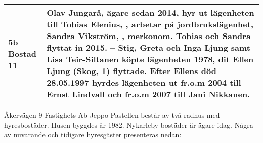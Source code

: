 \begin{center}
\begin{longtable}{l p{}}
    5b Bostad 11 & Olav Jungarå, ägare sedan 2014, hyr ut lägenheten till Tobias Elenius, \textborn 1993, arbetar på jordbrukslägenhet, Sandra Vikström, \textborn 1995, merkonom. Tobias och Sandra flyttat in 2015. -- Stig, Greta och Inga Ljung samt Lisa Teir-Siltanen köpte lägenheten 1978, dit Ellen Ljung (Skog, 1) flyttade. Efter Ellens död 28.05.1997 hyrdes lägenheten ut fr.o.m 2004 till Ernst Lindvall och fr.o.m 2007 till Jani Nikkanen. \\
    \hline
  \end{longtable}
\end{center}






Åkervägen 9 Fastighets Ab Jeppo Pastellen består av två radhus med hyresbostäder. Husen byggdes år 1982. Nykarleby bostäder är ägare idag. Några av nuvarande och tidigare hyresgäster presenteras nedan:\jhvspace{}

